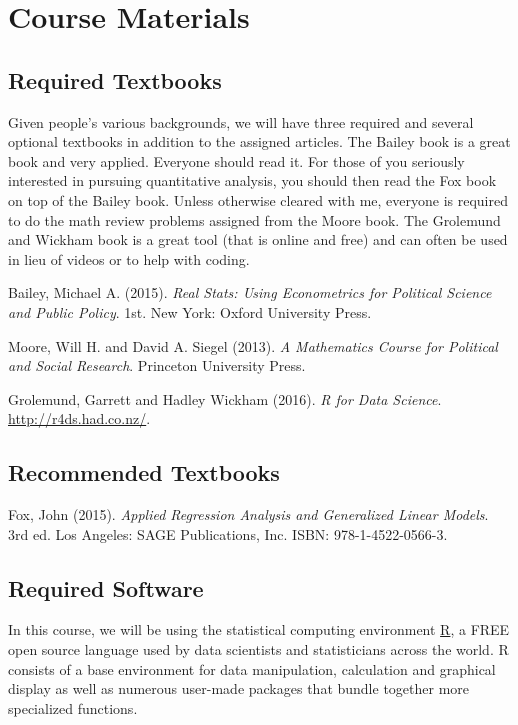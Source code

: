 \documentclass[11pt]{article}
\begin{document}

\section{Course Materials}

\subsection*{Required Textbooks}

Given people's various backgrounds, we will have three required and
several optional textbooks in addition to the assigned articles. The
Bailey book is a great book and very applied. Everyone should read it.
For those of you seriously interested in pursuing quantitative analysis,
you should then read the Fox book on top of the Bailey book. Unless
otherwise cleared with me, everyone is required to do the math review
problems assigned from the Moore book. The Grolemund and Wickham book is
a great tool (that is online and free) and can often be used in lieu of
videos or to help with coding.

Bailey, Michael A. (2015).
\emph{Real Stats: Using Econometrics for Political
Science and Public Policy}. 1st. New York: Oxford University Press.

Moore, Will H. and David A. Siegel (2013).
\emph{A Mathematics Course for Political and Social Research}. Princeton University Press.

Grolemund, Garrett and Hadley Wickham (2016). \emph{R for Data Science}.
\url{http://r4ds.had.co.nz/}.

\subsection*{Recommended Textbooks}

Fox, John (2015). \emph{Applied Regression Analysis and Generalized
Linear Models}. 3rd ed. Los Angeles: SAGE Publications, Inc. ISBN:
978-1-4522-0566-3.

\subsection*{Required Software}

In this course, we will be using the statistical computing environment \href{https://www.r-project.org/}{R}, a FREE open source language used by data scientists and statisticians across the world. R consists of a base environment for data manipulation, calculation and graphical display as well as numerous user-made packages that bundle together more specialized functions.
\end{document}
